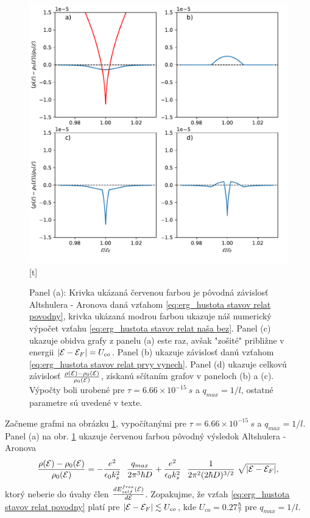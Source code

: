 \begin{figure}
\centering
\includegraphics[scale=0.8]{grafy/plot_tau_1_c_1}[t]
\caption{Panel (a): Krivka ukázaná červenou farbou je pôvodná závislosť Altshulera - Aronova daná vzťahom \eqref{eq:erg_hustota stavov relat povodny},
krivka ukázaná modrou farbou ukazuje náš numerický výpočet vzťahu \eqref{eq:erg_hustota stavov relat naša bez}. Panel (c) ukazuje obidva grafy z panelu (a) este raz, avšak "zošité" približne v energii  $|\mathcal{E}-\mathcal{E}_F| = U_{co}$. Panel (b) ukazuje závislosť danú vzťahom \eqref{eq:erg_hustota stavov relat prvy vynech}. Panel (d) ukazuje celkovú závislosť $\frac{\rho(\mathcal{E}) - \rho_0(\mathcal{E})}{\rho_0(\mathcal{E})}$, získanú sčítaním grafov v paneloch (b) a (c).
Výpočty boli urobené pre $\tau = 6.66 \times 10^{-15} \ s$ a $q_{max} = 1/l$, ostatné parametre sú uvedené v texte.}
\label{fig:results1}
\end{figure}


Začneme grafmi na obrázku \ref{fig:results1}, vypočítanými pre $\tau = 6.66 \times 10^{-15} \ s$ a $q_{max} = 1/l$. Panel (a) na obr. \ref{fig:results1} ukazuje červenou farbou pôvodný výsledok Altshulera - Aronova 
\begin{equation}\label{eq:erg_hustota stavov relat povodny}
\frac{\rho(\mathcal{E}) - \rho_0(\mathcal{E})}{\rho_0(\mathcal{E})} = - \frac{e^{2}}{\epsilon_0 k_s^{2}}\ \  \frac{q_{max}}{2\pi^3 \hbar D}
 +  \frac{e^{2}}{\epsilon_0 k_s^{2}} \ \ \frac{1}{2\pi^2 (2\hbar D)^{3/2}}  \ \sqrt{|\mathcal{E}-\mathcal{E}_F|} \text{,}
\end{equation}
ktorý neberie do úvahy člen $\frac{dE_{self}^{free}(\mathcal{E})}{d\mathcal{E}}$. Zopakujme, že vzťah \eqref{eq:erg_hustota stavov relat povodny}  platí pre $|\mathcal{E}-\mathcal{E}_F| \lesssim U_{co}$, kde  $U_{co} = 0.27 \frac{\hbar}{\tau}$ pre $q_{max} = 1/l$. 

